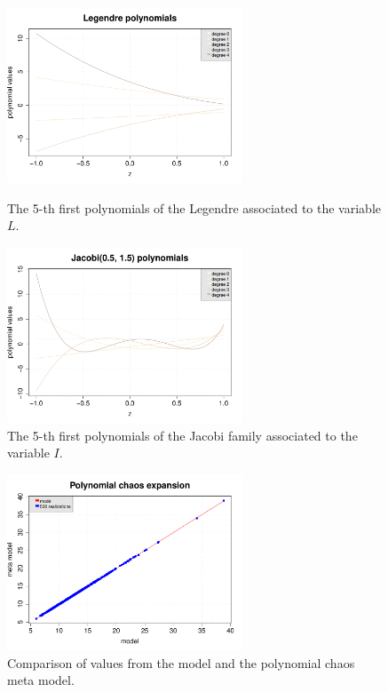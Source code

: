 \documentclass[11pt]{article}
\begin{document}
\begin{figure}[Hhbtp]
  \begin{minipage}{9cm}
    \begin{center}
      \includegraphics[width=7cm]{Figures/PCE_LegendrePolynomials_VariableL.pdf}
      \caption{The 5-th first polynomials of the Legendre associated to the variable $L$.}
      \label{PCE_L}
    \end{center}
  \end{minipage}
  \hfill
  \begin{minipage}{9cm}
    \begin{center}
      \includegraphics[width=7cm]{Figures/PCE_JacobiPolynomials_VariableI.pdf}
      \caption{The 5-th first polynomials of the Jacobi family associated to the variable $I$.}
      \label{PCE_I}
    \end{center}
  \end{minipage}
\end{figure}




\begin{figure}[Hhbtp]
  \begin{center}
    \includegraphics[width=7cm]{Figures/PCE_comparisonModels.pdf}
    \caption{Comparison of values from the model and the polynomial chaos meta model.}
    \label{ModelsComparison}
  \end{center}
\end{figure}
\end{document}

